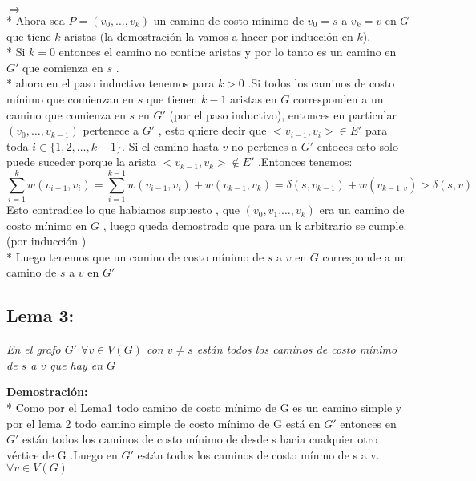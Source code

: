 \documentclass{article}
\begin{document}
    \noindent $\Longrightarrow $
    \\*
    Ahora sea $P = \left(v_0,\dots,v_k \right)$ un camino de costo m\'inimo de $v_0 = s $ a  $v_k = v$ en $G$ que tiene $k$ aristas (la demostraci\'on la vamos a hacer por inducci\'on en $k$).
    \\*
    Si $k=0$ entonces el camino no contine aristas y por lo tanto es un camino en $G'$ que comienza en $s$ .
    \\*
    ahora en el paso inductivo tenemos para $k>0$ .Si todos los caminos de costo m\'inimo que comienzan en $s$  que tienen $k-1$ aristas en $G$ corresponden a un camino que comienza en $s$ en $G'$ (por el paso inductivo), entonces en particular  $\left(v_0,\dots,v_{k-1}\right)$
    pertenece a $G'$ , esto quiere decir que $<v_{i-1},v_i> \in E'$ para toda $i \in \{1,2,\dots, k-1\}$. Si el camino hasta $v$ no pertenes a $G'$ entoces esto solo puede suceder porque la arista  $<v_{k-1}, v_{k}> \notin E'$ .Entonces tenemos:
    \begin{equation*}
        \sum_{i=1}^{k} w\left(v_{i-1},v_{i}\right) = \sum_{i=1}^{k-1} w\left(v_{i-1},v_{i}\right) + w\left(v_{k-1} , v_{k}\right) = \delta\left(s,v_{k-1}\right) + w\left(v_{k-1, v}\right) > \delta\left(s, v\right)
    \end{equation*}
    \noindent Esto contradice lo que habiamos supuesto , que $\left(v_0,v_1.\dots, v_k\right)$ era un camino de costo m\'inimo en $G$ , luego queda demostrado que para un k arbitrario se cumple. (por inducci\'on )
    \\*
    Luego tenemos que un camino de costo m\'inimo de $s$ a $v$ en $G$ corresponde a un camino de $s$ a $v$ en $G'$ 
    
    \vspace*{0.5cm} 

    \subsection*{Lema 3:}
    
    \textit{En el grafo $G'$ $\forall v \in V(G) $ con $v\neq s$  est\'an todos los caminos de costo m\'inimo de $s$ a $v$ que hay en $G$}
    
    \vspace*{0.3cm} 
     
    \noindent \textbf{Demostraci\'on:}
    \\*
    Como por el Lema1 todo  camino de costo m\'inimo de G es un camino simple y por el lema 2 todo camino simple de
    costo m\'inimo  de G est\'a en $G'$ entonces en $G'$ est\'an  todos los caminos de costo m\'inimo de desde s hacia 
    cualquier otro v\'ertice de G .Luego en $G'$  est\'an todos los caminos de costo m\'inmo de s a v. 
    $\forall v\in V(G)$
\end{document}
